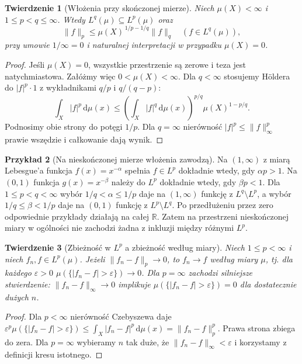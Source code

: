 \documentclass[11pt,a4paper,oneside]{book}
\numberwithin{equation}{chapter}
\theoremstyle{plain}
\newtheorem{twierdzenie}{Twierdzenie}[chapter]
\theoremstyle{definition}
\newtheorem{przyklad}[twierdzenie]{Przykład}
\theoremstyle{remark}
\begin{document}
\begin{twierdzenie}[Włożenia przy skończonej mierze]
\label{thm:lp-embedding-finite-14}
Niech $\mu(X)<\infty$ i $1\le p<q\le\infty$.
Wtedy $L^q(\mu)\subseteq L^p(\mu)$ oraz
\begin{equation}\label{eq:finite-embedding-14}
\|f\|_p\le\mu(X)^{\,1/p-1/q}\|f\|_q
\quad(f\in L^q(\mu)),
\end{equation}
przy umowie $1/\infty=0$ i naturalnej interpretacji
w przypadku $\mu(X)=0$.
\end{twierdzenie}
\begin{proof}
Jeśli $\mu(X)=0$, wszystkie przestrzenie są
zerowe i teza jest natychmiastowa. Załóżmy więc
$0<\mu(X)<\infty$.
Dla $q<\infty$ stosujemy Höldera do
$|f|^p\cdot1$ z wykładnikami $q/p$ i $q/(q-p)$:
\[
\int_X|f|^p\,\mathrm d\mu(x)
\le\left(\int_X|f|^q\,\mathrm d\mu(x)\right)^{p/q}
\mu(X)^{1-p/q}.
\]
Podnosimy obie strony do potęgi $1/p$.
Dla $q=\infty$ nierówność
$|f|^p\le\|f\|_\infty^p$ prawie wszędzie
i całkowanie dają wynik.
\end{proof}

\begin{przyklad}[Na nieskończonej mierze włożenia zawodzą]
Na $(1,\infty)$ z miarą Lebesgue'a
funkcja $f(x)=x^{-\alpha}$ spełnia
$f\in L^p$ dokładnie wtedy, gdy $\alpha p>1$.
Na $(0,1)$ funkcja $g(x)=x^{-\beta}$
należy do $L^p$ dokładnie wtedy, gdy $\beta p<1$.
Dla $1\le p<q<\infty$ wybór
$1/q<\alpha\le1/p$ daje na $(1,\infty)$
funkcję z $L^q\setminus L^p$,
a wybór $1/q\le\beta<1/p$ daje na $(0,1)$
funkcję z $L^p\setminus L^q$.
Po przedłużeniu przez zero odpowiednie przykłady
działają na całej $\mathbb R$.
Zatem na przestrzeni nieskończonej miary
w ogólności nie zachodzi żadna z inkluzji między
różnymi $L^p$.
\end{przyklad}

\begin{twierdzenie}[Zbieżność w $L^p$ a zbieżność według miary]
\label{thm:lp-to-measure-14}
Niech $1\le p<\infty$ i niech $f_n,f\in L^p(\mu)$.
Jeżeli $\|f_n-f\|_p\to0$, to $f_n\to f$
według miary $\mu$, tj. dla każdego $\varepsilon>0$
$\mu(\{|f_n-f|>\varepsilon\})\to0$.
Dla $p=\infty$ zachodzi silniejsze stwierdzenie:
$\|f_n-f\|_\infty\to0$ implikuje
$\mu(\{|f_n-f|>\varepsilon\})=0$ dla dostatecznie
dużych $n$.
\end{twierdzenie}
\begin{proof}
Dla $p<\infty$ nierówność Czebyszewa daje
$\varepsilon^p\mu(\{|f_n-f|>\varepsilon\})
\le\int_X|f_n-f|^p\,\mathrm d\mu(x)=\|f_n-f\|_p^p$.
Prawa strona zbiega do zera.
Dla $p=\infty$ wybieramy $n$ tak duże, że
$\|f_n-f\|_\infty<\varepsilon$ i korzystamy
z definicji kresu istotnego.
\end{proof}
\end{document}
